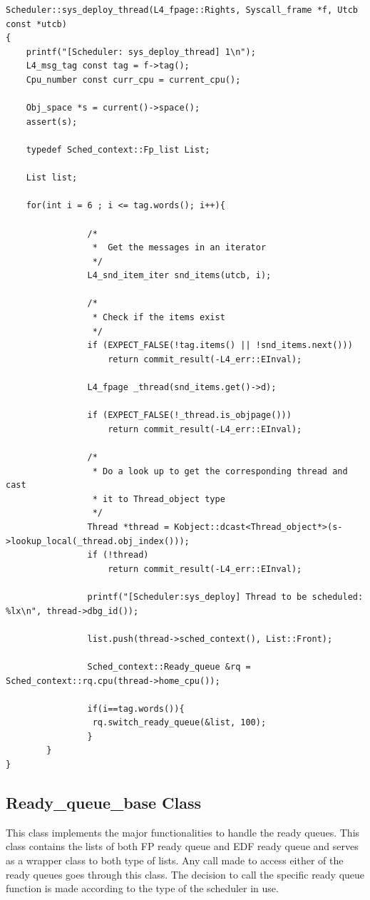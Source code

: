 \begin{lstlisting}[caption={Thread extraction and ready list creation},label=sysdeploycode, style=customcpp]
Scheduler::sys_deploy_thread(L4_fpage::Rights, Syscall_frame *f, Utcb const *utcb)
{
	printf("[Scheduler: sys_deploy_thread] 1\n");
	L4_msg_tag const tag = f->tag();
	Cpu_number const curr_cpu = current_cpu();

	Obj_space *s = current()->space();
	assert(s);

	typedef Sched_context::Fp_list List;

	List list;
	
	for(int i = 6 ; i <= tag.words(); i++){
				
				/*
				 *	Get the messages in an iterator
				 */
				L4_snd_item_iter snd_items(utcb, i);

				/*
				 * Check if the items exist
				 */
				if (EXPECT_FALSE(!tag.items() || !snd_items.next()))
					return commit_result(-L4_err::EInval);

				L4_fpage _thread(snd_items.get()->d);

				if (EXPECT_FALSE(!_thread.is_objpage()))
					return commit_result(-L4_err::EInval);

				/*
				 * Do a look up to get the corresponding thread and cast 
				 * it to Thread_object type
				 */
				Thread *thread = Kobject::dcast<Thread_object*>(s->lookup_local(_thread.obj_index()));
				if (!thread)
					return commit_result(-L4_err::EInval);

				printf("[Scheduler:sys_deploy] Thread to be scheduled: %lx\n", thread->dbg_id());

				list.push(thread->sched_context(), List::Front);

				Sched_context::Ready_queue &rq = Sched_context::rq.cpu(thread->home_cpu());

				if(i==tag.words()){
				 rq.switch_ready_queue(&list, 100);
				}
		}
}
\end{lstlisting}

\subsection{Ready\_queue\_base Class}

This class implements the major functionalities to handle the ready queues. This class contains the lists of both FP ready queue and EDF ready queue and serves as a wrapper class to both type of lists. Any call made to access either of the ready queues goes through this class. The decision to call the specific ready queue function is made according to the type of the scheduler in use.

